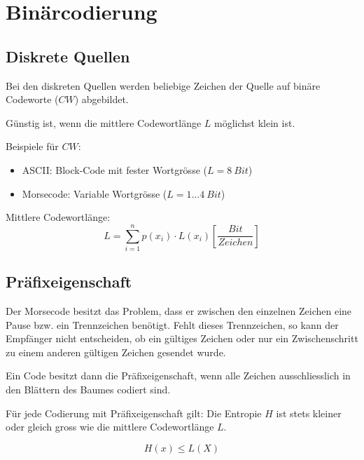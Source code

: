 \section{Binärcodierung}



\subsection{Diskrete Quellen}

Bei den diskreten Quellen werden beliebige Zeichen der Quelle auf binäre
Codeworte ($CW$) abgebildet.

Günstig ist, wenn die mittlere Codewortlänge $L$ möglichst klein ist.

Beispiele für $CW$:
\begin{itemize}
	\item ASCII: Block-Code mit fester Wortgrösse ($L = 8 \: Bit$)
	\item Morsecode: Variable Wortgrösse ($L = 1 \ldots 4 \: Bit$)
\end{itemize}

Mittlere Codewortlänge:
\[
	L = \sum_{i=1}^n p(x_i) \cdot L(x_i) \left[\frac{Bit}{Zeichen}\right]
\]


\subsection{Präfixeigenschaft}
\label{sec:praefixeigenschaft}

Der Morsecode besitzt das Problem, dass er zwischen den einzelnen Zeichen eine
Pause bzw. ein Trennzeichen benötigt. Fehlt dieses Trennzeichen, so kann der
Empfänger nicht entscheiden, ob ein gültiges Zeichen oder nur ein
Zwischenschritt zu einem anderen gültigen Zeichen gesendet wurde.

Ein Code besitzt dann die Präfixeigenschaft, wenn alle Zeichen ausschliesslich
in den Blättern des Baumes codiert sind.  

Für jede Codierung mit Präfixeigenschaft gilt: Die Entropie $H$ ist stets
kleiner oder gleich gross wie die mittlere Codewortlänge $L$.

\[
	H(x) \le L(X)
\]

